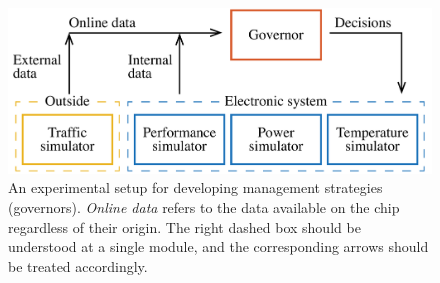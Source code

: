 \begin{figure}
  \centering
  \includegraphics[width=1.0\columnwidth]{include/assets/figures/development.pdf}

  \caption{An experimental setup for developing management strategies
  (governors). \emph{Online data} refers to the data available on the chip
  regardless of their origin. The right dashed box should be understood at a
  single module, and the corresponding arrows should be treated accordingly.}

\end{figure}

